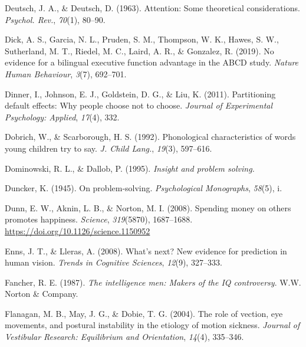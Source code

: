 \documentclass[
]{krantz}
\newlength{\cslhangindent}
\newlength{\cslentryspacingunit} %
\newenvironment{CSLReferences}[2] %
 {%
  \setlength{\parindent}{0pt}
  \ifodd #1
  \let\oldpar\par
  \def\par{\hangindent=\cslhangindent\oldpar}
  \fi
  \setlength{\parskip}{#2\cslentryspacingunit}
 }%
 {}
\begin{document}
\begin{CSLReferences}{1}{0}
\leavevmode{}%
Deutsch, J. A., \& Deutsch, D. (1963). Attention: Some theoretical considerations. \emph{Psychol. Rev.}, \emph{70}(1), 80--90.

\leavevmode{}%
Dick, A. S., Garcia, N. L., Pruden, S. M., Thompson, W. K., Hawes, S. W., Sutherland, M. T., Riedel, M. C., Laird, A. R., \& Gonzalez, R. (2019). No evidence for a bilingual executive function advantage in the ABCD study. \emph{Nature Human Behaviour}, \emph{3}(7), 692--701.

\leavevmode{}%
Dinner, I., Johnson, E. J., Goldstein, D. G., \& Liu, K. (2011). Partitioning default effects: Why people choose not to choose. \emph{Journal of Experimental Psychology: Applied}, \emph{17}(4), 332.

\leavevmode{}%
Dobrich, W., \& Scarborough, H. S. (1992). Phonological characteristics of words young children try to say. \emph{J. Child Lang.}, \emph{19}(3), 597--616.

\leavevmode{}%
Dominowski, R. L., \& Dallob, P. (1995). \emph{Insight and problem solving.}

\leavevmode{}%
Duncker, K. (1945). On problem-solving. \emph{Psychological Monographs}, \emph{58}(5), i.

\leavevmode{}%
Dunn, E. W., Aknin, L. B., \& Norton, M. I. (2008). Spending money on others promotes happiness. \emph{Science}, \emph{319}(5870), 1687--1688. \url{https://doi.org/10.1126/science.1150952}

\leavevmode{}%
Enns, J. T., \& Lleras, A. (2008). What's next? New evidence for prediction in human vision. \emph{Trends in Cognitive Sciences}, \emph{12}(9), 327--333.

\leavevmode{}%
Fancher, R. E. (1987). \emph{The intelligence men: Makers of the IQ controversy}. W.W. Norton \& Company.

\leavevmode{}%
Flanagan, M. B., May, J. G., \& Dobie, T. G. (2004). The role of vection, eye movements, and postural instability in the etiology of motion sickness. \emph{Journal of Vestibular Research: Equilibrium and Orientation}, \emph{14}(4), 335--346.


\end{CSLReferences}
\end{document}
